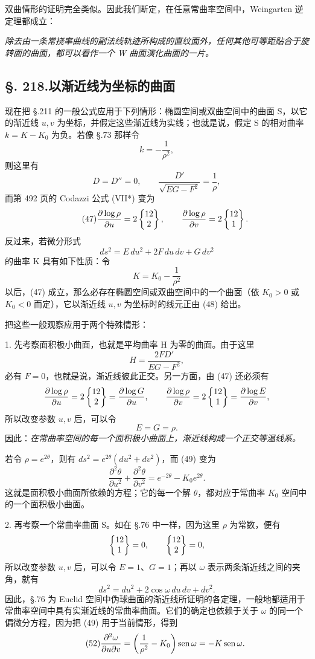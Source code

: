 双曲情形的证明完全类似。因此我们断定，在任意常曲率空间中，Weingarten 逆定理都成立：

\emph{除去由一条常挠率曲线的副法线轨迹所构成的直纹面外，任何其他可等距贴合于旋转面的曲面，都可以看作一个 W 曲面演化曲面的一片。}

\subsection*{\S. 218.\quad 以渐近线为坐标的曲面}

现在把 \S.211 的一般公式应用于下列情形：椭圆空间或双曲空间中的曲面 S，以它的渐近线 $u,v$ 为坐标，并假定这些渐近线为实线；也就是说，假定 S 的相对曲率 $k=K-K_0$ 为负。若像 \S.73 那样令
\[
k=-\frac1{\rho^2},
\]
则这里有
\[
D=D''=0,\qquad \frac{D'}{\sqrt{EG-F^2}}=\frac1\rho,
\]
而第 492 页的 Codazzi 公式 (VII*) 变为
\[
\tag{47}
\frac{\partial\log\rho}{\partial u}=2\left\{\begin{matrix}12\\2\end{matrix}\right\},
\qquad
\frac{\partial\log\rho}{\partial v}=2\left\{\begin{matrix}12\\1\end{matrix}\right\}.
\]
反过来，若微分形式
\[
\tag{48}
ds^2=E\,du^2+2F\,du\,dv+G\,dv^2
\]
的曲率 K 具有如下性质：令
\[
\tag{49}
K=K_0-\frac1{\rho^2}
\]
以后，(47) 成立，那么必存在椭圆空间或双曲空间中的一个曲面（依 $K_0>0$ 或 $K_0<0$ 而定），它以渐近线 $u,v$ 为坐标时的线元正由 (48) 给出。

把这些一般观察应用于两个特殊情形：

1. 先考察面积极小曲面，也就是平均曲率 H 为零的曲面。由于这里
\[
H=\frac{2FD'}{EG-F^2},
\]
必有 $F=0$，也就是说，渐近线彼此正交。另一方面，由 (47) 还必须有
\[
\frac{\partial\log\rho}{\partial u}=2\left\{\begin{matrix}12\\2\end{matrix}\right\}=\frac{\partial\log G}{\partial u},
\qquad
\frac{\partial\log\rho}{\partial v}=2\left\{\begin{matrix}12\\1\end{matrix}\right\}=\frac{\partial\log E}{\partial v},
\]
所以改变参数 $u,v$ 后，可以令
\[
E=G=\rho.
\]
因此：\emph{在常曲率空间的每一个面积极小曲面上，渐近线构成一个正交等温线系。}

若令 $\rho=e^{2\theta}$，则有 $ds^2=e^{2\theta}(du^2+dv^2)$，而 (49) 变为
\[
\tag{50}
\frac{\partial^2\theta}{\partial u^2}+\frac{\partial^2\theta}{\partial v^2}=e^{-2\theta}-K_0e^{2\theta}.
\]
这就是面积极小曲面所依赖的方程；它的每一个解 $\theta$，都对应于常曲率 $K_0$ 空间中的一个面积极小曲面。

2. 再考察一个常曲率曲面 S。如在 \S.76 中一样，因为这里 $\rho$ 为常数，便有
\[
\left\{\begin{matrix}12\\1\end{matrix}\right\}=0,
\qquad
\left\{\begin{matrix}12\\2\end{matrix}\right\}=0,
\]
所以改变参数 $u,v$ 后，可以令 $E=1$、$G=1$；再以 $\omega$ 表示两条渐近线之间的夹角，就有
\[
\tag{51}
ds^2=du^2+2\cos\omega\,du\,dv+dv^2.
\]
因此，\S.76 为 Euclid 空间中伪球曲面的渐近线所证明的各定理，一般地都适用于常曲率空间中具有实渐近线的常曲率曲面。它们的确定也依赖于关于 $\omega$ 的同一个偏微分方程，因为把 (49) 用于当前情形，得到
\[
\tag{52}
\frac{\partial^2\omega}{\partial u\partial v}=\left(\frac1{\rho^2}-K_0\right)\operatorname{sen}\omega=-K\operatorname{sen}\omega.
\]

